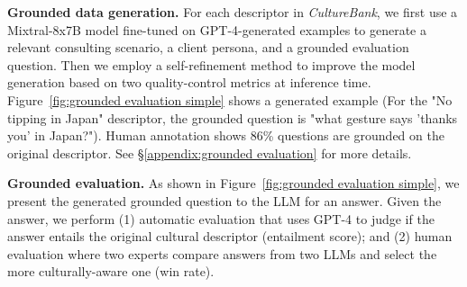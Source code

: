 \documentclass{article} %
\newcommand{\raya}[1]{\textcolor{green}{[#1 --Raya]}}
\newcommand{\dataname}{\textit{CultureBank}\xspace}
\begin{document}






\noindent\textbf{Grounded data generation.} %
For each descriptor in \dataname, we first use a Mixtral-8x7B model fine-tuned on GPT-4-generated examples to generate a relevant consulting scenario, a client persona, and a grounded evaluation question. Then we employ a self-refinement method to improve the model generation based on two quality-control metrics at inference time. Figure~\ref{fig:grounded evaluation simple} shows a generated example (For the "No tipping in Japan" descriptor, the grounded question is "what gesture says 'thanks you' in Japan?"). Human annotation shows 86\% questions are grounded on the original descriptor. See \S\ref{appendix:grounded evaluation} for more details.

\noindent\textbf{Grounded evaluation.} As shown in Figure~\ref{fig:grounded evaluation simple}, %
we present the generated grounded question to the LLM for an answer. Given the answer, we perform (1) automatic evaluation that uses GPT-4 to judge if the answer entails the original cultural descriptor (entailment score); and (2) human evaluation where two experts compare answers from two LLMs and select the more culturally-aware one (win rate). 
\end{document}
